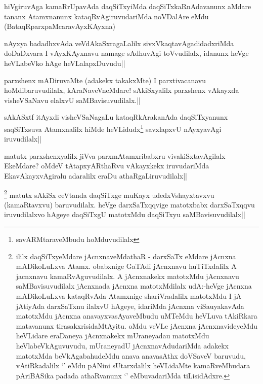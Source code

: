 
\begin{artha}
hiVgiruvAga kamaRrUpavAda daqSiTxyiMda daqSiTxkaRnAdavanunx aMdare tananx Atamxnanunx kataqRvAgiruvudariMda noVDalAre eMdu (BataqRparxpaMcaravAyxKAyxna)
\end{artha}


\begin{artha}
nAyxya badadhxvAda veVdAkaSxragaLalilx sivxVkaqtavAgadidadxriMda doDaDxvara I vAyxKAyxnavu namage sAdhuvAgi toVvudilalx, idanunx heVge heVLabeVko hAge heVLalapxDuvudu||
\end{artha}


\begin{artha}
parxshenx mADiruvaMte (adakekx takakxMte) I parxtivacanavu hoMdibaruvudilalx, kAraNaveVneMdare! sAkiSxyalilx parxshenx vAkayxda visheVSaNavu elalxvU saMBavisuvudilalx.||
\end{artha}


\begin{artha}
sAkASxtf itAyxdi visheVSaNagaLu kataqRkArakanAda daqSiTxyanunx saqSiTxsuva Atamxnalilx hiMde heVLidudx\footnote[1]{savARMtaraveMbudu hoMduvudilalx} savxlapxvU nAyxyavAgi iruvudilalx||
\end{artha}

\begin{artha}%
matutx parxshenxyalilx jiVva parxmAtamxribabxru vivakiSxtavAgilalx EkeMdare? oMdeV tAtapxyARthaRvu vAkayxkekx iruvudariMda EkavAkayxvAgiralu adaralilx eraDu athaRgaLiruvudilalx||
\end{artha}

\begin{artha}
\footnote[1]{ililx daqSiTxyeMdare jAcnxnaveMdathaR - darxSaTx eMdare jAcnxna mADikoLuLxva Atamx. obabxnige GaTAdi jAcnxnavu huTiTxdalilx A jacnxnavu kamaRvAguvudilalx. A jAcnxnakekx matotxMdu jAcnxnavu saMBavisuvudilalx jAcnxnada jAcnxna matotxMdilalx udA:-heVge jAcnxna mADikoLuLxva kataqRvAda Atamxnige shariVradalilx matotxMdu I jA jAtiyAda darxSaTxnu ilalxvU hAgeye, idariMda jAcnxna viSauyakavAda matotxMdu jAcnxna anavayxvasAyaveMbudu uMTeMdu heVLuva tAkiRkara matavanunx tirasakxrisidaMtAyitu. oMdu veVLe jAcnxna jAcnxnavideyeMdu heVLidare eraDaneya jAcnxnakekx mUraneyadau matotxMdu heVlabeVkAguvuvudu, mUraneyadU jAcnxnavAdudariMda adakekx matotxMda beVkAgabahudeMdu anava anavasAthx doVSaveV baruvudu, vAtiRkadalilx `\stext ' eMdu pANini sUtarxdalilx heVLidaMte kamaRveMbudara pAriBASika padada athaRvanunx `\stext ' eMbuvadariMda tiLisidAdxre.} matutx sAkiSx ceVtanda daqSiTxge muKayx udedxVshayxtavxvu (kamaRtavxvu) baruvudilalx. heVge darxSaTxqqvige matotxbabx darxSaTxqqvu iruvudilalxvo hAgeye daqSiTxgU matotxMdu daqSiTxyu saMBavisuvudilalx||
\end{artha}

